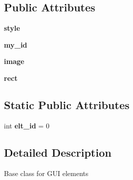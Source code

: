\subsection*{\-Public \-Attributes}
\begin{DoxyCompactItemize}
\item 
\hypertarget{classinterface_1_1gui_1_1gui__elements_1_1_g_u_i_element_afe001a8facea864198d808ad96a35a28}{{\bfseries style}}\label{classinterface_1_1gui_1_1gui__elements_1_1_g_u_i_element_afe001a8facea864198d808ad96a35a28}

\item 
\hypertarget{classinterface_1_1gui_1_1gui__elements_1_1_g_u_i_element_a5a32185e6fd48d1ae09d28fdb26baf0a}{{\bfseries my\-\_\-id}}\label{classinterface_1_1gui_1_1gui__elements_1_1_g_u_i_element_a5a32185e6fd48d1ae09d28fdb26baf0a}

\item 
\hypertarget{classinterface_1_1gui_1_1gui__elements_1_1_g_u_i_element_ae611da3f025e1147619842b19a165fac}{{\bfseries image}}\label{classinterface_1_1gui_1_1gui__elements_1_1_g_u_i_element_ae611da3f025e1147619842b19a165fac}

\item 
\hypertarget{classinterface_1_1gui_1_1gui__elements_1_1_g_u_i_element_af982ab8df34f613f9fd842355ddb7697}{{\bfseries rect}}\label{classinterface_1_1gui_1_1gui__elements_1_1_g_u_i_element_af982ab8df34f613f9fd842355ddb7697}

\end{DoxyCompactItemize}
\subsection*{\-Static \-Public \-Attributes}
\begin{DoxyCompactItemize}
\item 
\hypertarget{classinterface_1_1gui_1_1gui__elements_1_1_g_u_i_element_a073a838109d6ce27c17341d2d894c76c}{int {\bfseries elt\-\_\-id} = 0}\label{classinterface_1_1gui_1_1gui__elements_1_1_g_u_i_element_a073a838109d6ce27c17341d2d894c76c}

\end{DoxyCompactItemize}


\subsection{\-Detailed \-Description}
\begin{DoxyVerb}Base class for GUI elements \end{DoxyVerb}
 

